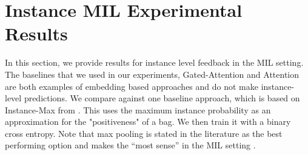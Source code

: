 \documentclass{article}
\begin{document}
\section{Instance MIL Experimental Results}
\label{appendix: MIL instance}
In this section, we provide results for instance level feedback in the MIL setting. The baselines that we used in our experiments, Gated-Attention and Attention are both examples of embedding based approaches and do not make instance-level predictions. We compare against one baseline approach, which is based on Instance-Max from \citet{ilse2018attention}. This uses the maximum instance probability as an approximation for the "positiveness" of a bag. We then train it with a binary cross entropy. Note that max pooling is stated in the literature as the best performing option and makes the “most sense” in the MIL setting \cite{ilse2018attention, wang2018revisiting}.
\end{document}
